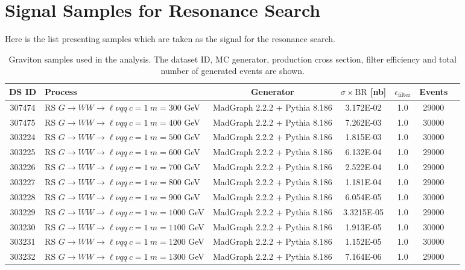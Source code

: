 \section{Signal Samples for Resonance Search}
Here is the list presenting samples which are taken as the signal for the resonance search.
\begin{landscape}
	\begin{table}[!htb]
		\caption{Graviton samples used in the analysis. The dataset ID, MC generator, production cross section, filter efficiency and total number of generated events are shown.}
		\label{tabular:mc_samples_graviton}
		\begin{footnotesize}
			\begin{center}
				\begin{tabular}{|c|l|c|c|c|c|r|}
					\hline
					DS ID  & Process & Generator & $\sigma\times\text{BR}$ [nb]  & $\epsilon_{\text{filter}}$ & Events \\ \hline
					307474 & RS $G \to WW \to \ell\nu qq ~c=1  ~m=300$ GeV& MadGraph 2.2.2 + Pythia 8.186 & 3.172E-02  & 1.0 & 29000 \\
					307475 & RS $G \to WW \to \ell\nu qq ~c=1  ~m=400$ GeV& MadGraph 2.2.2 + Pythia 8.186 & 7.262E-03  & 1.0 & 30000 \\
					303224 & RS $G \to WW \to \ell\nu qq ~c=1  ~m=500$ GeV& MadGraph 2.2.2 + Pythia 8.186 & 1.815E-03   &1.0& 30000 \\
					303225 & RS $G \to WW \to \ell\nu qq ~c=1  ~m=600$ GeV& MadGraph 2.2.2 + Pythia 8.186 & 6.132E-04   &1.0& 29000 \\
					303226 & RS $G \to WW \to \ell\nu qq ~c=1  ~m=700$ GeV& MadGraph 2.2.2 + Pythia 8.186 & 2.522E-04   &1.0& 29000 \\
					303227 & RS $G \to WW \to \ell\nu qq ~c=1  ~m=800$ GeV& MadGraph 2.2.2 + Pythia 8.186 & 1.181E-04   &1.0& 29000 \\
					303228 & RS $G \to WW \to \ell\nu qq ~c=1  ~m=900$ GeV& MadGraph 2.2.2 + Pythia 8.186 & 6.054E-05   &1.0& 30000 \\
					303229 & RS $G \to WW \to \ell\nu qq ~c=1 ~m=1000$ GeV& MadGraph 2.2.2 + Pythia 8.186 & 3.3215E-05  &1.0& 29000 \\
					303230 & RS $G \to WW \to \ell\nu qq ~c=1 ~m=1100$ GeV& MadGraph 2.2.2 + Pythia 8.186 & 1.913E-05   &1.0& 30000 \\
					303231 & RS $G \to WW \to \ell\nu qq ~c=1 ~m=1200$ GeV& MadGraph 2.2.2 + Pythia 8.186 & 1.152E-05   &1.0& 30000 \\
					303232 & RS $G \to WW \to \ell\nu qq ~c=1 ~m=1300$ GeV& MadGraph 2.2.2 + Pythia 8.186 & 7.164E-06   &1.0& 29000 \\

\end{tabular}
\end{center}
\end{footnotesize}
\end{table}
\end{landscape}
